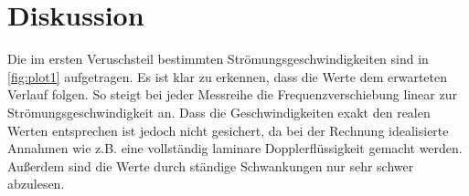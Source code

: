 \section{Diskussion}
\label{sec:Diskussion}
Die im ersten Veruschsteil bestimmten Strömungsgeschwindigkeiten sind in \autoref{fig:plot1} aufgetragen.
Es ist klar zu erkennen, dass die Werte dem erwarteten Verlauf folgen.
So steigt bei jeder Messreihe die Frequenzverschiebung linear zur Strömungsgeschwindigkeit an.
Dass die Geschwindigkeiten exakt den realen Werten entsprechen ist jedoch nicht
gesichert, da bei der Rechnung idealisierte Annahmen wie z.B. eine vollständig laminare
Dopplerflüssigkeit gemacht werden. Außerdem sind die Werte durch ständige Schwankungen nur sehr schwer abzulesen.



